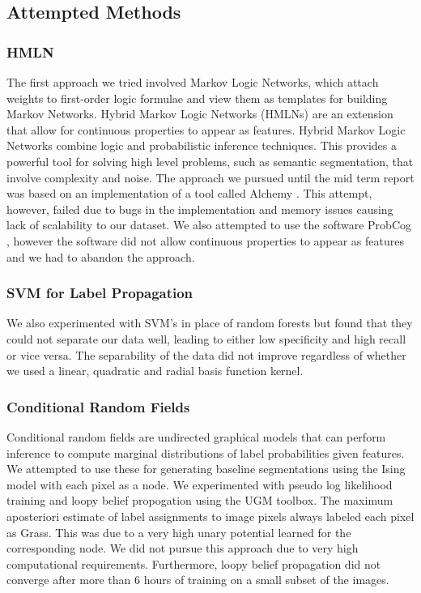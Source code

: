 \documentclass{article} %
\begin{document}
\subsection{Attempted Methods}

\subsubsection{HMLN}
The first approach we tried involved Markov Logic Networks, \cite{Domingos06unifyinglogical} \cite{Richardson06markovlogic} which attach weights to first-order logic formulae and view them as templates for building Markov Networks. Hybrid Markov Logic Networks (HMLNs)\cite{wang2008hybrid} are an extension that allow for continuous properties to appear as features. Hybrid Markov Logic Networks combine logic and probabilistic inference techniques. This provides a powerful tool for solving high level problems, such as semantic segmentation, that involve complexity and noise. The approach we pursued until the mid term report was based on an implementation of a tool called Alchemy \cite{alchemy}. This attempt, however, failed due to bugs in the implementation and memory issues causing lack of scalability to our dataset. We also attempted to use the software ProbCog \cite{progcog}, however the software did not allow continuous properties to appear as features and we had to abandon the approach. 

\subsubsection{SVM for Label Propagation}
We also experimented with SVM's in place of random forests but found that they could not separate our data well, leading to either low specificity and high recall or vice versa. The separability of the data did not improve regardless of whether we used a linear, quadratic and radial basis function kernel.

\subsubsection{Conditional Random Fields}
Conditional random fields \cite{lafferty2001conditional} are undirected graphical models that can perform inference to compute marginal distributions of label probabilities given features.
We attempted to use these for generating baseline segmentations using the Ising model with each pixel as a node.
We experimented with pseudo log likelihood training and loopy belief propogation using the UGM toolbox\cite{UGMSoftware}.
The maximum aposteriori estimate of label assignments to image pixels always labeled each pixel as Grass.
This was due to a very high unary potential learned for the corresponding node. 
We did not pursue this approach due to very high computational requirements.
Furthermore, loopy belief propagation did not converge after more than 6 hours of training on a small subset of the images.
\end{document}
